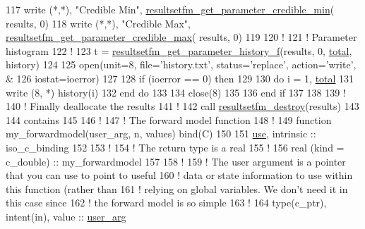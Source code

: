 \begin{DoxyCodeInclude}
117 \textcolor{keyword}{write} (*,*), \textcolor{stringliteral}{"Credible Min"}, \hyperlink{resultsetfm_8c_a04b3b91f4cdd59c4704416ed454ca6f6}{resultsetfm\_get\_parameter\_credible\_min}(
      results, 0)
118 \textcolor{keyword}{write} (*,*), \textcolor{stringliteral}{"Credible Max"}, \hyperlink{resultsetfm_8c_ac7e84096e87c4eae3980705e7e4f6926}{resultsetfm\_get\_parameter\_credible\_max}(
      results, 0)
119 
120 \textcolor{comment}{!}
121 \textcolor{comment}{! Parameter histogram}
122 \textcolor{comment}{!}
123 t = \hyperlink{resultsetfm_8c_aad0d90000049dd989a00f827728a99e3}{resultsetfm\_get\_parameter\_history\_f}(results, 0, 
      \hyperlink{rjmcmcf__mpi_8h_a1829e955eab35ef63200105c2de1ad94}{total}, history)
124 
125 \textcolor{keyword}{open}(unit=8, file=\textcolor{stringliteral}{'history.txt'}, status=\textcolor{stringliteral}{'replace'}, action=\textcolor{stringliteral}{'write'}, &
126      iostat=ioerror)
127 
128 \textcolor{keywordflow}{if} (ioerror == 0) \textcolor{keywordflow}{then}
129 
130    \textcolor{keywordflow}{do} i = 1, \hyperlink{rjmcmcf__mpi_8h_a1829e955eab35ef63200105c2de1ad94}{total}
131       \textcolor{keyword}{write} (8, *) history(i)
132 \textcolor{keywordflow}{   end do}
133    
134    \textcolor{keyword}{close}(8)
135    
136 \textcolor{keywordflow}{end if}
137 
138 
139 \textcolor{comment}{!}
140 \textcolor{comment}{! Finally deallocate the results}
141 \textcolor{comment}{!}
142 \textcolor{keyword}{call }\hyperlink{resultsetfm_8c_a187f38ceca7446af14a1a2b6183db017}{resultsetfm\_destroy}(results)
143 
144 \textcolor{keyword}{contains}
145 
146 \textcolor{comment}{!}
147 \textcolor{comment}{! The forward model function}
148 \textcolor{comment}{!}
149 \textcolor{keyword}{function }my\_forwardmodel(user\_arg, n, values) bind(C)
150 
151   \hyperlink{rjmcmcf_8h_a821b46c311d079e47b9c09782230af02}{use}, \textcolor{keywordtype}{intrinsic} :: iso\_c\_binding 
152 
153   \textcolor{comment}{!}
154   \textcolor{comment}{! The return type is a real }
155   \textcolor{comment}{!}
156   \textcolor{keywordtype}{real (kind = c\_double)} :: my\_forwardmodel
157 
158   \textcolor{comment}{!}
159   \textcolor{comment}{! The user argument is a pointer that you can use to point to useful}
160   \textcolor{comment}{! data or state information to use within this function (rather than}
161   \textcolor{comment}{! relying on global variables. We don't need it in this case since}
162   \textcolor{comment}{! the forward model is so simple}
163   \textcolor{comment}{!}
164   \textcolor{keywordtype}{type}(c\_ptr), \textcolor{keywordtype}{intent(in)}, \textcolor{keywordtype}{value} :: \hyperlink{rjmcmcf__mpi_8h_ab68b3a27bfe943a73cf680c2e439e070}{user\_arg}

\end{DoxyCodeInclude}
